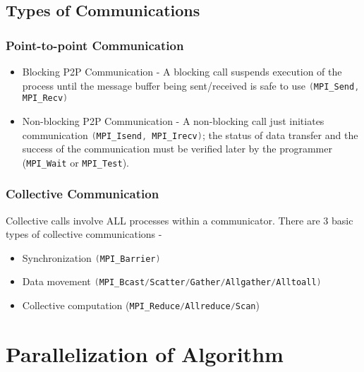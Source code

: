 \documentclass{article}
\newcommand{\cpp}{\lstinline[language=C++]}
\begin{document}
    \subsection{Types of Communications}
    \subsubsection{Point-to-point Communication}
        \begin{itemize}
            \item {Blocking P2P Communication} - A blocking call suspends execution of the process until the message buffer being sent/received is safe to use \cpp{(MPI_Send, MPI_Recv)}
            \item {Non-blocking P2P Communication} - A non-blocking call just initiates communication \cpp{(MPI_Isend, MPI_Irecv)}; the status of data transfer and the success of the communication must be verified later by the programmer (\cpp{MPI_Wait} or \cpp{MPI_Test}).  
        \end{itemize}
    \subsubsection{Collective Communication}
    Collective calls involve ALL processes within a communicator. There are 3 basic types of collective communications - 
        \begin{itemize}
            \item Synchronization \cpp{(MPI_Barrier)}
            \item Data movement \cpp{(MPI_Bcast/Scatter/Gather/Allgather/Alltoall)} 
            \item Collective computation (\cpp{MPI_Reduce/Allreduce/Scan}) 
        \end{itemize}
    
    \clearpage
    
    \section{Parallelization of Algorithm}
    
\end{document}
